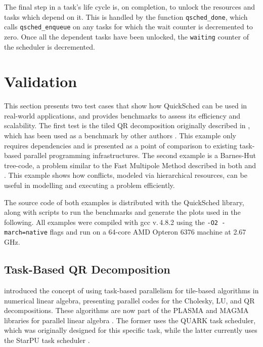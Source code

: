 \documentclass[preprint]{elsarticle}
\begin{document}
The final step in a task's life cycle is, on completion,
to unlock the resources and tasks which depend on it.
This is handled by the function {\tt qsched\_done}, which
calls {\tt qsched\_enqueue} on any tasks for which the
wait counter is decremented to zero.
Once all the dependent tasks have been unlocked, the
{\tt waiting} counter of the scheduler is decremented.


\section{Validation}

This section presents two test cases that show
how QuickSched can be used in real-world applications, and
provides benchmarks to assess its efficiency and scalability.
The first test is the tiled QR decomposition originally
described in \cite{ref:Buttari2009}, which has been used as a benchmark
by other authors \cite{ref:Agullo2009b,ref:Badia2009,ref:Bosilca2012}.
This example only requires dependencies and is presented 
as a point of comparison to existing task-based parallel
programming infrastructures.
The second example is a Barnes-Hut tree-code, a problem
similar to the Fast Multipole Method described in both
\cite{ref:Ltaief2012} and \cite{ref:Agullo2013}.
This example shows how conflicts, modeled
via hierarchical resources, can be useful in modelling and executing
a problem efficiently.

The source code of both examples is distributed with the
QuickSched library, along with scripts to run the benchmarks
and generate the plots used in the following.
All examples were compiled with gcc v.\,4.8.2 using the
{\tt -O2 -march=native} flags and run on
a 64-core AMD Opteron 6376 machine at 2.67\,GHz.


\subsection{Task-Based QR Decomposition}

\cite{ref:Buttari2009} introduced the concept of using task-based
parallelism for tile-based algorithms in numerical linear algebra,
presenting parallel codes for the Cholesky, LU, and QR
decompositions.
These algorithms are now part of the PLASMA and MAGMA
libraries for parallel linear algebra \cite{ref:Agullo2009}.
The former uses the QUARK task scheduler, which was originally
designed for this specific task, while the latter currently uses
the StarPU task scheduler \cite{ref:Agullo2011}.
\end{document}
